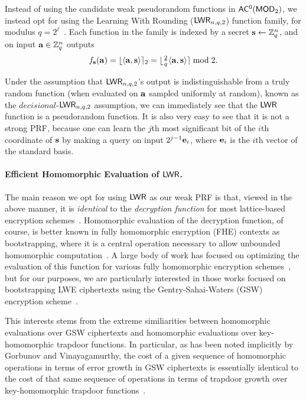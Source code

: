 Instead of using the candidate weak pseudorandom functions in $\mathsf{AC^{0}}(\mathsf{MOD}_2)$, we instead opt for using the Learning With Rounding ($\mathsf{LWR}_{n,q,2}$) function family, for modulus $q=2^{\ell}$~\cite{DBLP:conf/eurocrypt/BanerjeePR12}. Each function in the family is indexed by a secret $\mathbf{s} \gets \mathbb{Z}_q^n$, and on input $\mathbf{a} \in \mathbb{Z}_q^{n}$ outputs 
\[f_{\mathbf{s}}(\mathbf{a})=\lfloor\langle\mathbf{a},\mathbf{s}\rangle\rceil_{2}=\lfloor\tfrac{2}{q} \langle\mathbf{a},\mathbf{s}\rangle\rceil \bmod{2}.\]

Under the assumption that $\mathsf{LWR}_{n,q,2}$'s output is indistinguishable from a truly random function (when evaluated on $\mathbf{a}$ sampled uniformly at random), known as the $decisional$-$\mathsf{LWR}_{n,q,2}$ assumption, we can immediately see that the $\mathsf{LWR}$ function is a pseudorandom function. It is also very easy to see that it is not a strong PRF, because one can learn the $j$th most significant bit of the $i$th coordinate of $\mathbf{s}$ by making a query on input $2^{j-1}\mathbf{e}_i$, where $\mathbf{e}_i$ is the $i$th vector of the standard basis. 


\paragraph{Efficient Homomorphic Evaluation of $\mathsf{LWR}$.}
The main reason we opt for using $\mathsf{LWR}$ as our weak PRF is that, viewed in the above manner, it is \emph{identical} to the \emph{decryption function} for most lattice-based encryption schemes~\cite{DBLP:journals/jacm/Regev09}. Homomorphic evaluation of the decryption function, of course, is better known in fully homomorphic encryption (FHE) contexts as bootstrapping, where it is a central operation necessary to allow unbounded homomorphic computation~\cite{GentryThesis09}. A large body of work has focused on optimizing the evaluation of this function for various fully homomorphic encryption schemes~\cite{DBLP:conf/pkc/GentryHS12,DBLP:conf/crypto/Alperin-SheriffP13,DBLP:conf/pkc/OrsiniPS15,DBLP:conf/eurocrypt/HaleviS15}, but for our purposes, we are particularly interested in those works focused on bootstrapping LWE ciphertexts using the Gentry-Sahai-Waters (GSW) ~\cite{DBLP:conf/crypto/GentrySW13} encryption scheme~\cite{DBLP:conf/crypto/Alperin-SheriffP14,DBLP:conf/pkc/HiromasaAO15,DBLP:conf/eurocrypt/DucasM15,cryptoeprint:2016:870}.


This interests stems from the extreme similiarities between homomorphic evaluations over GSW ciphertexts and homomorphic evaluations over key-homomorphic trapdoor functions. In particular, as has been noted implicitly by Gorbunov and Vinayagamurthy, the cost of a given sequence of homomorphic operations in terms of error growth in GSW ciphertexts is essentially identical to the cost of that same sequence of operations in terms of trapdoor growth over key-homomorphic trapdoor functions~\cite{DBLP:conf/asiacrypt/GorbunovV15}.

